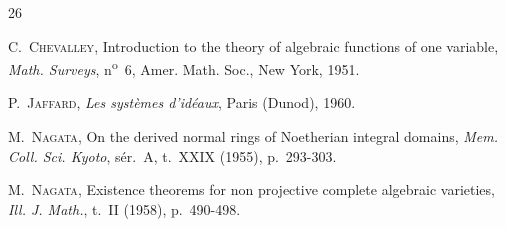 \clearpage
{}
{}
\renewcommand{\bibname}{Bibliographie \textit{(suite)}}

\begin{thebibliography}{26}

C.~\textsc{Chevalley},
Introduction to the theory of algebraic functions of one variable,
\emph{Math. Surveys}, n\textsuperscript{o}~6, Amer. Math. Soc., New York, 1951.

P.~\textsc{Jaffard},
\emph{Les systèmes d'idéaux}, Paris (Dunod), 1960.

M.~\textsc{Nagata},
On the derived normal rings of Noetherian integral domains,
\emph{Mem. Coll. Sci. Kyoto}, sér.~A, t.~XXIX (1955), p.~293-303.

M.~\textsc{Nagata},
Existence theorems for non projective complete algebraic varieties,
\emph{Ill. J. Math.}, t.~II (1958), p.~490-498.

\end{thebibliography}
